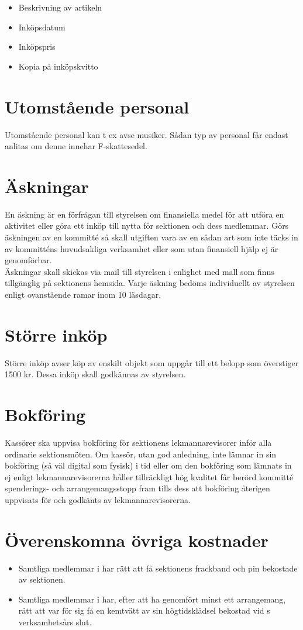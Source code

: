 \documentclass[11pt, includeaddress]{classes/cthit}
\begin{document}
\begin{itemize}
	\item Beskrivning av artikeln
	\item Inköpsdatum
	\item Inköpspris
	\item Kopia på inköpskvitto
\end{itemize}


\section{Utomstående personal}
Utomstående personal kan t ex avse musiker. Sådan typ av personal får endast anlitas om denne innehar F-skattesedel.

\section{Äskningar}
En äskning är en förfrågan till styrelsen om finansiella medel för att utföra en aktivitet eller göra ett inköp till nytta för sektionen och dess medlemmar. Görs äskningen av en kommitté så skall utgiften vara av en sådan art som inte täcks in av kommitténs huvudsakliga verksamhet eller som utan finansiell hjälp ej är genomförbar. \\

Äskningar skall skickas via mail till styrelsen i enlighet med mall som finns tillgänglig på sektionens hemsida. Varje äskning bedöms individuellt av styrelsen enligt ovanstående ramar inom 10 läsdagar.

\section{Större inköp}
Större inköp avser köp av enskilt objekt som uppgår till ett belopp som överstiger 1500 kr. Dessa inköp skall godkännas av styrelsen.

\section{Bokföring}
Kassörer ska uppvisa bokföring för sektionens lekmannarevisorer inför alla ordinarie sektionsmöten. Om kassör, utan god anledning, inte lämnar in sin bokföring (så väl digital som fysisk) i tid eller om den bokföring som lämnats in ej enligt lekmannarevisorerna håller tillräckligt hög kvalitet får berörd kommitté spenderings- och arrangemangsstopp fram tills dess att bokföring återigen uppvisats för och godkänts av lekmannarevisorerna.

\section{Överenskomna övriga kostnader}
\begin{itemize}
	\item Samtliga medlemmar i \FANBARERIT{} har rätt att få sektionens frackband och pin bekostade av sektionen.
	\item Samtliga medlemmar i \FANBARERIT{} har, efter att ha genomfört minst ett arrangemang, rätt att var för sig få en kemtvätt av sin högtidsklädsel bekostad vid \FANBARERIT{}s verksamhetsårs slut.
\end{itemize}
\end{document}
